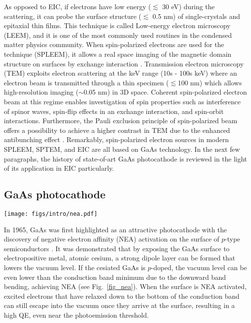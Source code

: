 As opposed to EIC, if electrons have low energy ($\lesssim$ 30 eV) during the scattering, it can probe the surface structure ($\lesssim$ 0.5 nm) of single-crystals and epitaxial thin films. This technique is called Low-energy electron microscopy (LEEM), and it is one of the most commonly used routines in the condensed matter physics community. When spin-polarized electrons are used for the technique (SPLEEM), it allows a real space imaging of the magnetic domain structure on surfaces by exchange interaction \cite{n2002spin}. Transmission electron microscopy (TEM) exploits electron scattering at the keV range (10s - 100s keV) where an electron beam is transmitted through a thin specimen ($\lesssim$100 nm)  which allows high-resolution imaging ($\sim$0.05 nm) in 3D space. Coherent spin-polarized electron beam at this regime enables investigation of spin properties such as interference of spinor waves, spin-flip effects in an exchange interaction, and spin-orbit interactions. Furthermore, the Pauli exclusion principle of spin-polarized beam offers a possibility to achieve a higher contrast in TEM due to the enhanced antibunching effect \cite{kuwahara2014coherence}. Remarkably, spin-polarized electron sources in modern SPLEEM, SPTEM, and EIC are all based on GaAs technology. In the next few paragraphs, the history of state-of-art GaAs photocathode is reviewed in the light of its application in EIC particularly.

\subsection{GaAs photocathode}

\begin{figure*}
\centering
\texttt{[image: figs/intro/nea.pdf]}
\caption{Negative electron affinity (NEA) activation process on GaAs \cite{liu2017_ComprehensiveEvaluationFactors}. Electron affinity (EA) is defined as the energy difference between vacuum level $E_\infty$ and the bottom of the conduction band $E_{CB}$. NEA is achieved when the vacuum level is lower than the bottom of the conduction band.}
\label{fig_nea}
\end{figure*}

In 1965, GaAs was first highlighted as an attractive photocathode with the discovery of negative electron affinity (NEA) activation on the surface of $p$-type semiconductors \cite{scheer1965}. It was demonstrated that by exposing the GaAs surface to electropositive metal, atomic cesium, a strong dipole layer can be formed that lowers the vacuum level. If the cesiated GaAs is $p$-doped, the vacuum level can be even lower than the conduction band minimum due to the downward band bending, achieving NEA (see Fig.~\ref{fig_nea}). When the surface is NEA activated, excited electrons that have relaxed down to the bottom of the conduction band can still escape into the vacuum once they arrive at the surface, resulting in a high QE, even near the photoemission threshold.


